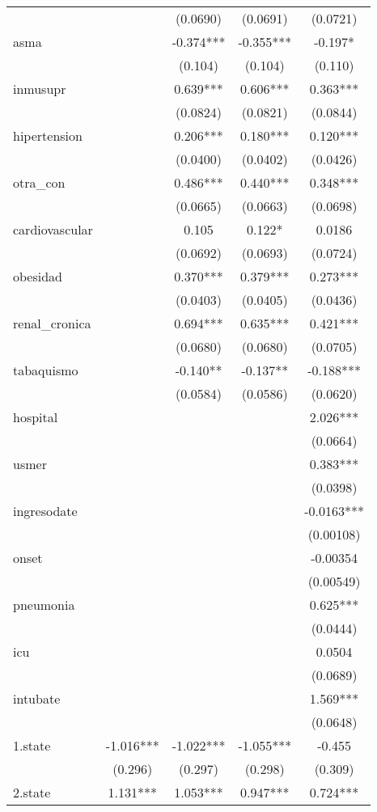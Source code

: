 \documentclass[]{article}
\begin{document}
\begin{tabular}{lcccc}
 &  & (0.0690) & (0.0691) & (0.0721) \\
asma &  & -0.374*** & -0.355*** & -0.197* \\
 &  & (0.104) & (0.104) & (0.110) \\
inmusupr &  & 0.639*** & 0.606*** & 0.363*** \\
 &  & (0.0824) & (0.0821) & (0.0844) \\
hipertension &  & 0.206*** & 0.180*** & 0.120*** \\
 &  & (0.0400) & (0.0402) & (0.0426) \\
otra\_con &  & 0.486*** & 0.440*** & 0.348*** \\
 &  & (0.0665) & (0.0663) & (0.0698) \\
cardiovascular &  & 0.105 & 0.122* & 0.0186 \\
 &  & (0.0692) & (0.0693) & (0.0724) \\
obesidad &  & 0.370*** & 0.379*** & 0.273*** \\
 &  & (0.0403) & (0.0405) & (0.0436) \\
renal\_cronica &  & 0.694*** & 0.635*** & 0.421*** \\
 &  & (0.0680) & (0.0680) & (0.0705) \\
tabaquismo &  & -0.140** & -0.137** & -0.188*** \\
 &  & (0.0584) & (0.0586) & (0.0620) \\
hospital &  &  &  & 2.026*** \\
 &  &  &  & (0.0664) \\
usmer &  &  &  & 0.383*** \\
 &  &  &  & (0.0398) \\
ingresodate &  &  &  & -0.0163*** \\
 &  &  &  & (0.00108) \\
onset &  &  &  & -0.00354 \\
 &  &  &  & (0.00549) \\
pneumonia &  &  &  & 0.625*** \\
 &  &  &  & (0.0444) \\
icu &  &  &  & 0.0504 \\
 &  &  &  & (0.0689) \\
intubate &  &  &  & 1.569*** \\
 &  &  &  & (0.0648) \\
1.state & -1.016*** & -1.022*** & -1.055*** & -0.455 \\
 & (0.296) & (0.297) & (0.298) & (0.309) \\
2.state & 1.131*** & 1.053*** & 0.947*** & 0.724*** \\

\end{tabular}
\end{document}
